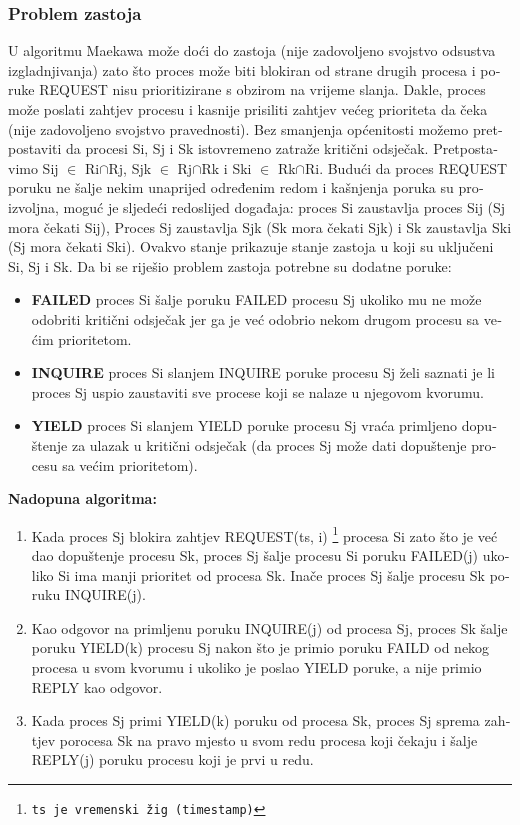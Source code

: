 \documentclass[12pt]{rectors}
\begin{document}
\begin{otherlanguage}{croatian}
\subsubsection{Problem zastoja}
U algoritmu Maekawa može doći do zastoja (nije zadovoljeno svojstvo odsustva izgladnjivanja) zato što proces može biti blokiran od strane drugih procesa i poruke REQUEST nisu prioritizirane s obzirom na vrijeme slanja. Dakle, proces može poslati zahtjev procesu i kasnije prisiliti zahtjev većeg prioriteta da čeka (nije zadovoljeno svojstvo pravednosti). 
Bez smanjenja općenitosti možemo pretpostaviti da procesi Si, Sj i Sk istovremeno zatraže kritični odsječak. Pretpostavimo Sij $\in$ Ri$\cap$Rj, Sjk $\in$ Rj$\cap$Rk i Ski $\in$ Rk$\cap$Ri. Budući da proces REQUEST poruku ne šalje nekim unaprijed određenim redom i kašnjenja poruka su proizvoljna, moguć je sljedeći redoslijed događaja:
proces Si zaustavlja proces Sij (Sj mora čekati Sij), Proces Sj zaustavlja Sjk (Sk mora čekati Sjk) i Sk zaustavlja Ski (Sj mora čekati Ski). Ovakvo stanje prikazuje stanje zastoja u koji su uključeni Si, Sj i Sk.
\newline
Da bi se riješio problem zastoja potrebne su dodatne poruke:
\begin{itemize}
	\item \textbf{FAILED}  proces Si šalje poruku FAILED procesu Sj ukoliko mu ne može odobriti kritični odsječak jer ga je već odobrio nekom drugom procesu sa većim prioritetom.
	\item \textbf{INQUIRE} proces Si slanjem INQUIRE poruke procesu Sj želi saznati je li proces Sj uspio zaustaviti sve procese koji se nalaze u njegovom kvorumu.
	\item \textbf{YIELD} proces Si slanjem YIELD poruke procesu Sj vraća primljeno dopuštenje za ulazak u kritični odsječak (da proces Sj može dati dopuštenje procesu sa većim prioritetom).
\end{itemize}

\textbf{Nadopuna algoritma:}
\begin{enumerate}
	\item Kada proces Sj blokira zahtjev REQUEST(ts, i) \footnote{\texttt{ts je vremenski žig (timestamp)}} procesa Si zato što je već dao dopuštenje procesu Sk, proces Sj šalje procesu Si poruku FAILED(j) ukoliko Si ima manji prioritet od procesa Sk. Inače proces Sj šalje procesu Sk poruku INQUIRE(j).
	\item Kao odgovor na primljenu poruku INQUIRE(j) od procesa Sj, proces Sk šalje poruku YIELD(k) procesu Sj nakon što je primio poruku FAILD od nekog procesa u svom kvorumu i ukoliko je poslao YIELD poruke, a nije primio REPLY kao odgovor.
	\item Kada proces Sj primi YIELD(k) poruku od procesa Sk, proces Sj sprema zahtjev porocesa Sk na pravo mjesto u svom redu procesa koji čekaju i šalje REPLY(j) poruku procesu koji je prvi u redu.
\end{enumerate}


\end{otherlanguage}
\end{document}
